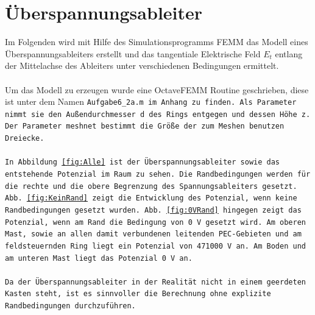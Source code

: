 
\section{Überspannungsableiter}
Im Folgenden wird mit Hilfe des Simulationsprogramms FEMM das Modell eines Überspannungsableiters erstellt und das tangentiale Elektrische Feld $E_t$ entlang der Mittelachse des Ableiters unter verschiedenen Bedingungen ermittelt. \\ \\
Um das Modell zu erzeugen wurde eine OctaveFEMM Routine geschrieben, diese ist unter dem Namen \tt{Aufgabe6\_2a.m} im Anhang zu finden. Als Parameter nimmt sie den Außendurchmesser \tt{d} des Rings entgegen und dessen Höhe \tt{z}. Der Parameter \tt{meshnet} bestimmt die Größe der zum Meshen benutzen Dreiecke. \\ \\
In Abbildung \ref{fig:Alle} ist der Überspannungsableiter sowie das entstehende Potenzial im Raum zu sehen. Die Randbedingungen werden für die rechte und die obere Begrenzung des Spannungsableiters gesetzt. Abb. \ref{fig:KeinRand} zeigt die Entwicklung des Potenzial, wenn keine Randbedingungen gesetzt wurden. Abb. \ref{fig:0VRand} hingegen zeigt das Potenzial, wenn am Rand die Bedingung von \SI{0}{\volt} gesetzt wird. Am oberen Mast, sowie an allen damit verbundenen leitenden PEC-Gebieten und am feldsteuernden Ring liegt ein Potenzial von \SI{471000}{\volt} an. Am Boden und am unteren Mast liegt das Potenzial \SI{0}{\volt} an. \\ \\
Da der Überspannungsableiter in der Realität nicht in einem geerdeten Kasten steht, ist es sinnvoller die Berechnung ohne explizite Randbedingungen durchzuführen. 
\newpage
